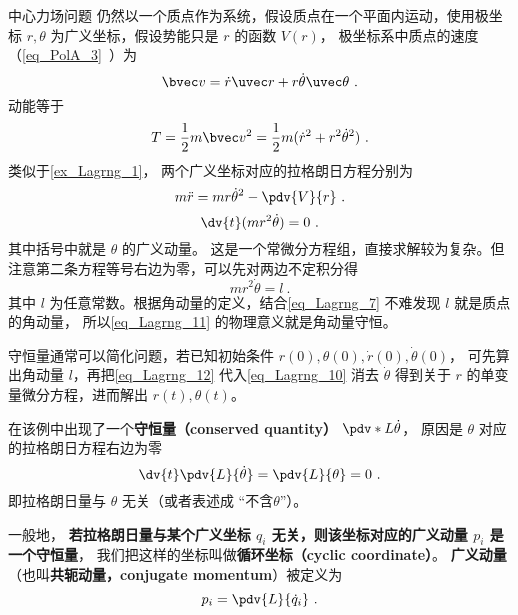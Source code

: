 \begin{example}{中心力场问题}
仍然以一个质点作为系统，假设质点在一个平面内运动，使用极坐标 $r, \theta$ 为广义坐标，假设势能只是 $r$ 的函数 $V(r)$， 极坐标系中质点的速度（\autoref{eq_PolA_3}~）为
\begin{equation}\label{eq_Lagrng_7}
\bvec v = \dot r\uvec r + r\dot \theta \uvec \theta~.
\end{equation}
动能等于
\begin{equation}
T = \frac12 m\bvec v^2 = \frac12 m(\dot r^2 + r^2 \dot \theta^2)~.
\end{equation}
类似于\autoref{ex_Lagrng_1}， 两个广义坐标对应的拉格朗日方程分别为
\begin{equation}\label{eq_Lagrng_10}
m\ddot r = mr \dot \theta^2 - \pdv{V}{r}~.
\end{equation}
\begin{equation}\label{eq_Lagrng_11}
\dv{t} (m r^2\dot \theta)  = 0~.
\end{equation}
其中括号中就是 $\theta$ 的广义动量。 这是一个常微分方程组，直接求解较为复杂。但注意第二条方程等号右边为零，可以先对两边不定积分得
\begin{equation}\label{eq_Lagrng_12}
mr^2\dot\theta = l~.
\end{equation}
其中 $l$ 为任意常数。根据角动量的定义，结合\autoref{eq_Lagrng_7} 不难发现 $l$ 就是质点的角动量， 所以\autoref{eq_Lagrng_11} 的物理意义就是角动量守恒。

守恒量通常可以简化问题，若已知初始条件 $r(0), \theta (0), \dot r(0), \dot\theta (0)$， 可先算出角动量 $l$，再把\autoref{eq_Lagrng_12} 代入\autoref{eq_Lagrng_10} 消去 $\dot\theta$ 得到关于 $r$ 的单变量微分方程，进而解出 $r(t), \theta (t)$。
\end{example}

在该例中出现了一个\textbf{守恒量（conserved quantity）} $\pdv*{L}{\dot\theta}$， 原因是 $\theta$ 对应的拉格朗日方程右边为零
\begin{equation}
\dv{t}\pdv{L}{\dot\theta} = \pdv{L}{\theta} = 0~.
\end{equation}
即拉格朗日量与 $\theta$ 无关（或者表述成 “不含$\theta$”）。

一般地， \textbf{若拉格朗日量与某个广义坐标 $q_i$ 无关，则该坐标对应的广义动量 $p_i$ 是一个守恒量}， 我们把这样的坐标叫做\textbf{循环坐标（cyclic coordinate）}。 \textbf{广义动量}（也叫\textbf{共轭动量，conjugate momentum}）被定义为
\begin{equation}\label{eq_Lagrng_13}
p_i = \pdv{L}{\dot q_i}~.
\end{equation}


